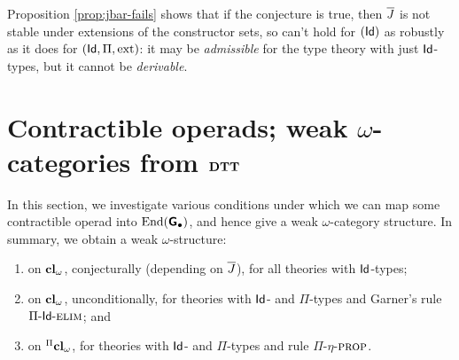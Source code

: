 \documentclass{amsart}
\newcommand{\ext}{\mathrm{ext}}
\begin{document}
Proposition \ref{prop:jbar-fails} shows that if the conjecture is true, then $\overline{J}$ is not stable under extensions of the constructor sets, so can't hold for $(\mathsf{Id})$ as robustly as it does for $(\Id,\Pi,\ext)$: it may be \emph{admissible} for the type theory with just $\mathsf{Id}$-types, but it cannot be \emph{derivable}. \\



\begin{para} 
\end{para}

























\section{Contractible operads; weak $\omega$-categories from $\mathbf{DTT}$} \label{sec:contractibility}



 In this section, we investigate various conditions under which we can map some contractible operad into $\mathrm{End}(\textsf{\textbf{G}}_\bullet)$, and hence give a weak $\omega$-category structure.  In summary, we obtain a weak $\omega$-structure:
\begin{enumerate}
\item on $\mathbf{cl}_\omega$, conjecturally (depending on $\overline{J}$), for all theories with $\mathsf{Id}$-types;
\item on $\mathbf{cl}_\omega$, unconditionally, for theories with $\mathsf{Id}$- and $\Pi$-types and Garner's rule ${\Pi\mbox{-}\mathsf{Id}\mbox{-}\textsc{elim}}$; and
\item on ${}^\Pi \mathbf{cl}_\omega$, for theories with $\mathsf{Id}$- and $\Pi$-types and rule $\Pi$-$\eta$-$\textsc{prop}$.
\end{enumerate}
\end{document}
